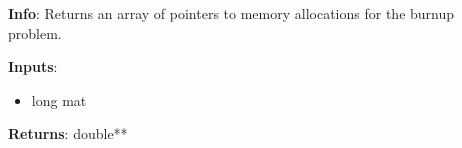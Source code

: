 \textbf{Info}: Returns an array of pointers to memory allocations for the
burnup problem.

\noindent \textbf{Inputs}:
\begin{itemize}
\item{long mat}
\end{itemize}

\noindent \textbf{Returns}: double**

